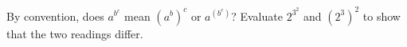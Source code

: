 By convention, does $a^{b^c}$ mean $\left(a^b\right)^c$ or $a^{\left(b^c\right)}$? Evaluate $2^{3^2}$ and $\left(2^3\right)^2$ to show that the two readings differ.
